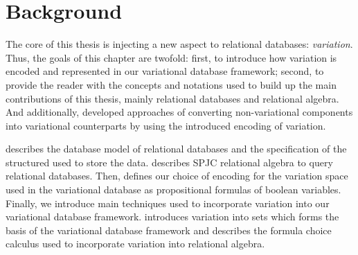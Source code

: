 \chapter{Background}
\label{ch:bg}


The core of this thesis is injecting a new aspect to relational databases: \emph{variation}.
Thus, the goals of this chapter are twofold: 
%
first, to introduce how variation is encoded and represented in our variational database framework;
%
second, to provide the reader with the concepts and notations
used to build up the main contributions of this thesis, mainly relational databases and
relational algebra.
%
And additionally, developed approaches of converting non-variational components into
variational counterparts by using the introduced encoding of variation. 

%
 describes the database model of relational databases and the specification of
the structured used to store the data.  describes SPJC relational algebra to query
relational databases. 
%
Then, 
 defines our choice of encoding for the variation space used in the 
variational database as propositional formulas of boolean variables.
%
Finally, we introduce main techniques used to incorporate variation into our variational 
database framework.
 introduces variation into sets which forms the basis of the variational database
framework and  describes the formula choice calculus used to incorporate 
variation into relational algebra.



%




